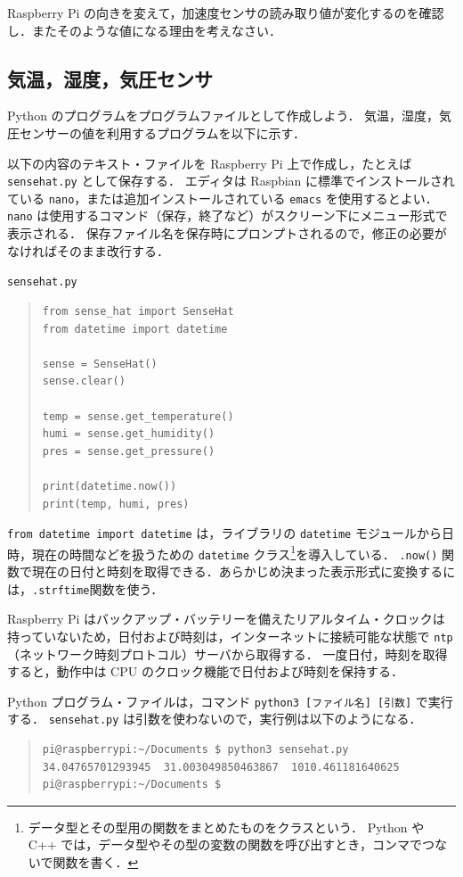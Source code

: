 \documentclass[11pt,a4,epsf]{report}
\begin{document}
\begin{excercise}
Raspberry Pi の向きを変えて，加速度センサの読み取り値が変化するのを確認し．またそのような値になる理由を考えなさい．
\end{excercise}

\subsection{気温，湿度，気圧センサ}

Python のプログラムをプログラムファイルとして作成しよう．
気温，湿度，気圧センサーの値を利用するプログラムを以下に示す．

以下の内容のテキスト・ファイルを Raspberry Pi 上で作成し，たとえば \verb+sensehat.py+ として保存する．
エディタは Raspbian に標準でインストールされている \verb+nano+，または追加インストールされている \verb+emacs+ を使用するとよい．
\verb+nano+ は使用するコマンド（保存，終了など）がスクリーン下にメニュー形式で表示される．
保存ファイル名を保存時にプロンプトされるので，修正の必要がなければそのまま改行する．
 \begin{itembox}[l]{\tt sensehat.py}
\begin{quote}
\small
\begin{verbatim}
from sense_hat import SenseHat
from datetime import datetime

sense = SenseHat()
sense.clear()

temp = sense.get_temperature()
humi = sense.get_humidity()
pres = sense.get_pressure()
    
print(datetime.now())
print(temp, humi, pres)
\end{verbatim}
\end{quote}
\end{itembox}
\verb+from datetime import datetime+ は，ライブラリの \verb+datetime+ モジュールから日時，現在の時間などを扱うための \verb+datetime+ クラス\footnote{データ型とその型用の関数をまとめたものをクラスという． Python や C++ では，データ型やその型の変数の関数を呼び出すとき，コンマでつないで関数を書く．}を導入している．
\verb+.now()+ 関数で現在の日付と時刻を取得できる．あらかじめ決まった表示形式に変換するには，\verb+.strftime+関数を使う．

Raspberry Pi はバックアップ・バッテリーを備えたリアルタイム・クロックは持っていないため，日付および時刻は，インターネットに接続可能な状態で \verb+ntp+ （ネットワーク時刻プロトコル）サーバから取得する．
一度日付，時刻を取得すると，動作中は CPU のクロック機能で日付および時刻を保持する．

Python プログラム・ファイルは，コマンド \verb+python3 [ファイル名] [引数]+ で実行する．
\verb+sensehat.py+ は引数を使わないので，実行例は以下のようになる．
\begin{quote}
\small
\begin{verbatim}
pi@raspberrypi:~/Documents $ python3 sensehat.py 
34.04765701293945  31.003049850463867  1010.461181640625 
pi@raspberrypi:~/Documents $ 
\end{verbatim}
\end{quote}
\end{document}
